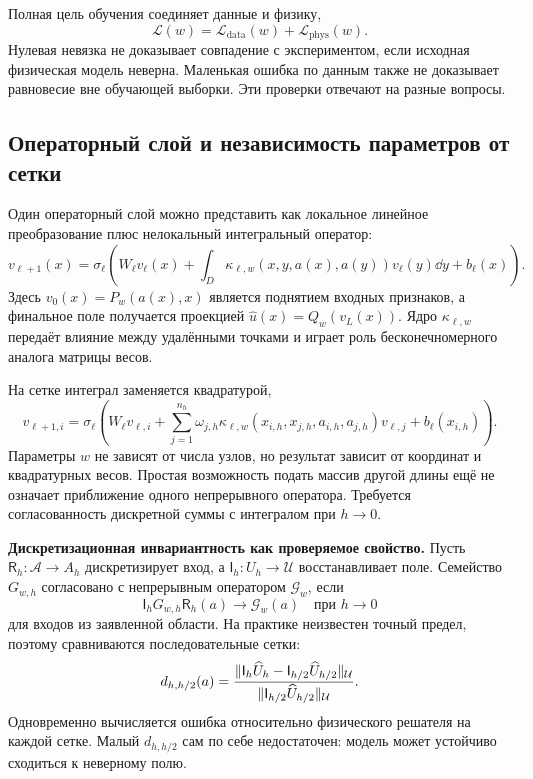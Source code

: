 Полная цель обучения соединяет данные и физику,
\begin{equation}
 \mathcal L(w)
 =
 \mathcal L_{\mathrm{data}}(w)
 +
 \mathcal L_{\mathrm{phys}}(w).
\end{equation}
Нулевая невязка не доказывает совпадение с экспериментом, если исходная физическая модель неверна. Маленькая ошибка по данным также не доказывает равновесие вне обучающей выборки. Эти проверки отвечают на разные вопросы.

\subsection{Операторный слой и независимость параметров от сетки}
Один операторный слой можно представить как локальное линейное преобразование плюс нелокальный интегральный оператор:
\begin{equation}
 v_{\ell+1}(x)
 =
 \sigma_{\ell}\left(
 W_{\ell}v_{\ell}(x)
 +
 \int_D
 \kappa_{\ell,w}(x,y,a(x),a(y))
 v_{\ell}(y)
 \dd y
 +b_{\ell}(x)
 \right).
\end{equation}
Здесь $v_0(x)=P_w(a(x),x)$ является поднятием входных признаков, а финальное поле получается проекцией $\widehat u(x)=Q_w(v_L(x))$. Ядро $\kappa_{\ell,w}$ передаёт влияние между удалёнными точками и играет роль бесконечномерного аналога матрицы весов.

На сетке интеграл заменяется квадратурой,
\begin{equation}
 v_{\ell+1,i}
 =
 \sigma_{\ell}\left(
 W_{\ell}v_{\ell,i}
 +
 \sum_{j=1}^{n_h}
 \omega_{j,h}
 \kappa_{\ell,w}(x_{i,h},x_{j,h},a_{i,h},a_{j,h})
 v_{\ell,j}
 +b_{\ell}(x_{i,h})
 \right).
\end{equation}
Параметры $w$ не зависят от числа узлов, но результат зависит от координат и квадратурных весов. Простая возможность подать массив другой длины ещё не означает приближение одного непрерывного оператора. Требуется согласованность дискретной суммы с интегралом при $h\to0$.

\medskip
\noindent\textbf{Дискретизационная инвариантность как проверяемое свойство.}
Пусть $\mathsf R_h:\mathcal A\to A_h$ дискретизирует вход, а $\mathsf I_h:U_h\to\mathcal U$ восстанавливает поле. Семейство $G_{w,h}$ согласовано с непрерывным оператором $\mathcal G_w$, если
\begin{equation}
 \mathsf I_h
 G_{w,h}
 \mathsf R_h(a)
 \longrightarrow
 \mathcal G_w(a)
 \quad
 \text{при }h\to0
\end{equation}
для входов из заявленной области. На практике неизвестен точный предел, поэтому сравниваются последовательные сетки:
\begin{equation}
 d_{h,h/2}(a)
 =
 \frac{
  \lVert
   \mathsf I_h\widehat U_h
   -
   \mathsf I_{h/2}\widehat U_{h/2}
  \rVert_{\mathcal U}
 }{
  \lVert
   \mathsf I_{h/2}\widehat U_{h/2}
  \rVert_{\mathcal U}
 }.
\end{equation}
Одновременно вычисляется ошибка относительно физического решателя на каждой сетке. Малый $d_{h,h/2}$ сам по себе недостаточен: модель может устойчиво сходиться к неверному полю.

